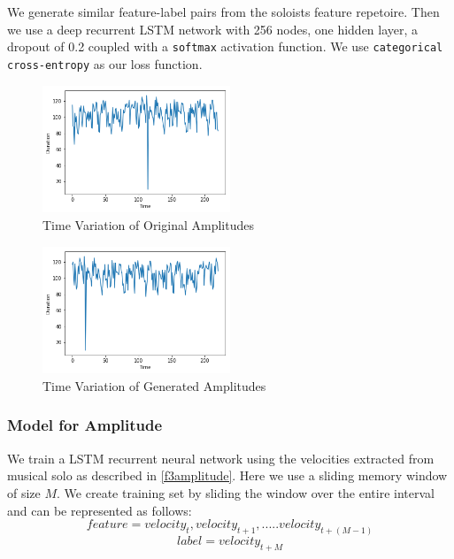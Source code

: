 \documentclass[conference]{IEEEtran}
\begin{document}
We generate similar feature-label pairs from the soloists feature repetoire. Then we use a deep recurrent LSTM network with 256 nodes, one hidden layer, a dropout of 0.2 coupled with a \texttt{softmax} activation function. We use \texttt{categorical cross-entropy} as our loss function.\\

\begin{figure}[h]
\includegraphics[width=0.5\textwidth]{IEEEtran/amp_o.png}
\caption{Time Variation of Original Amplitudes}
\label{fig:figure3}
\end{figure}

\begin{figure}[h]
\includegraphics[width=0.5\textwidth]{IEEEtran/amp_g.png}
\caption{Time Variation of Generated Amplitudes}
\label{fig:figure4}
\end{figure}

\subsubsection{Model for Amplitude}
We train a LSTM recurrent neural network using the velocities extracted from musical solo as described in \ref{f3amplitude}. Here we use a sliding memory window of size $M$. We create training set by sliding the window over the entire interval and can be represented as follows:
$$feature = {velocity_{t},velocity_{t+1},.....velocity_{t+(M-1)}}$$
$$label = {velocity_{t+M}}$$
\end{document}
